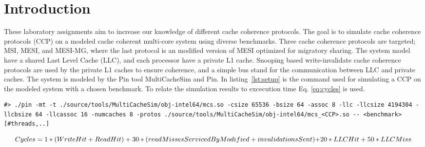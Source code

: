 \section{Introduction}
\label{sec:int}
These laboratory assignments aim to increase our knowledge of different cache coherence protocols. The goal is to simulate cache coherence protocols (CCP) on a modeled cache coherent multi-core system using diverse benchmarks. Three cache coherence protocols are targeted; MSI, MESI, and MESI-MG, where the last protocol is an modified version of MESI optimized for migratory sharing. The system model have a shared Last Level Cache (LLC), and each processor have a private L1 cache. Snooping based write-invalidate cache coherence protocols are used by the private L1 caches to ensure coherence, and a simple bus stand for the communication between LLC and private caches. The system is modeled by the Pin tool MultiCacheSim and Pin. In listing~\ref{lst:setup} is the command used for simulating a CCP on the modeled system with a chosen benchmark. To relate the simulation results to excecution time Eq. \ref{eq:cycles} is used. 



\begin{lstlisting}[label=lst:setup, basicstyle=\scriptsize, caption={Command used for simulation.}]
#> ./pin -mt -t ./source/tools/MultiCacheSim/obj-intel64/mcs.so -csize 65536 -bsize 64 -assoc 8 -llc -llcsize 4194304 -llcbsize 64 -llcassoc 16 -numcaches 8 -protos ./source/tools/MultiCacheSim/obj-intel64/mcs_<CCP>.so -- <benchmark> [#threads,..]
\end{lstlisting}

\begin{equation}
	$$\label{eq:cycles}$$
	Cycles = 1 * (WriteHit+ReadHit) + 30 * (readMissesServicedByModified + invalidationsSent)$$ $$+ 20 * LLCHit + 50 * LLCMiss
\end{equation}